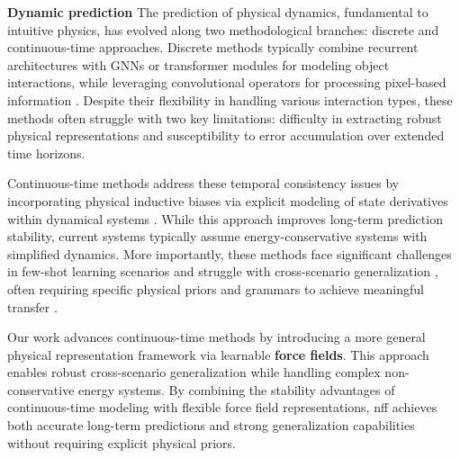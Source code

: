 \textbf{Dynamic prediction\quad{}}
The prediction of physical dynamics, fundamental to intuitive physics, has evolved along two methodological branches: discrete and continuous-time approaches. Discrete methods typically combine recurrent architectures with GNNs \citep{battaglia2016interaction,qi2021learning} or transformer modules \citep{wu2022slotformer} for modeling object interactions, while leveraging convolutional operators for processing pixel-based information \citep{shi2015convolutional,wang2022predrnn}. Despite their flexibility in handling various interaction types, these methods often struggle with two key limitations: difficulty in extracting robust physical representations and susceptibility to error accumulation over extended time horizons.

Continuous-time methods address these temporal consistency issues by incorporating physical inductive biases via explicit modeling of state derivatives within dynamical systems \citep{chen2018neural,greydanus2019hamiltonian,zhong2020symplectic,cranmer2020lagrangian,norcliffe2020second}. While this approach improves long-term prediction stability, current systems typically assume energy-conservative systems with simplified dynamics. More importantly, these methods face significant challenges in few-shot learning scenarios and struggle with cross-scenario generalization \citep{chen2020learning}, often requiring specific physical priors and grammars to achieve meaningful transfer \citep{xu2021bayesian}.

Our work advances continuous-time methods by introducing a more general physical representation framework via learnable \textbf{force fields}. This approach enables robust cross-scenario generalization while handling complex non-conservative energy systems. By combining the stability advantages of continuous-time modeling with flexible force field representations, \ac{nff} achieves both accurate long-term predictions and strong generalization capabilities without requiring explicit physical priors.

